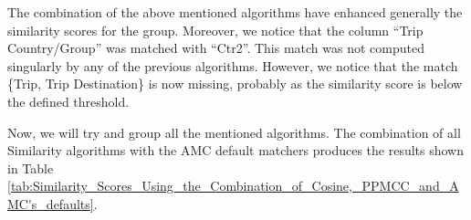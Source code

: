 The combination of the above mentioned algorithms have enhanced generally the similarity scores for the group. Moreover, we notice that the column ``Trip Country/Group'' was matched with ``Ctr2''. This match was not computed singularly by any of the previous algorithms. However, we notice that the match \{Trip, Trip Destination\} is now missing, probably as the similarity score is below the defined threshold.

Now, we will try and group all the mentioned algorithms. The combination of all Similarity algorithms with the AMC default matchers produces the results shown in Table \ref{tab:Similarity_Scores_Using_the_Combination_of_Cosine,_PPMCC_and_AMC's_defaults}.

\begin{table}[ht]
\centering
{}
\end{table}
